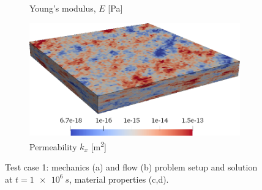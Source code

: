\begin{figure} [htbp]
\begin{subfigure}{0.48\textwidth}
	    \caption{Young's modulus, $E$ [Pa]}
        \label{fig:cart_young}
    \end{subfigure}
    \hfill
    \begin{subfigure}{0.48\textwidth}
        \includegraphics[width=0.9\linewidth]{figs/Cart/perm}
	    \caption{Permeability $k_x$ [\unit{m^2}]}
        \label{fig:cart_perm}
    \end{subfigure}
    \caption[Test case 1 setup]{Test case 1: mechanics (a) and flow (b) problem setup and solution at $t = \qty{1e6}{s}$, material properties (c,d).}
    \label{fig:cart_setup}
\end{figure}

